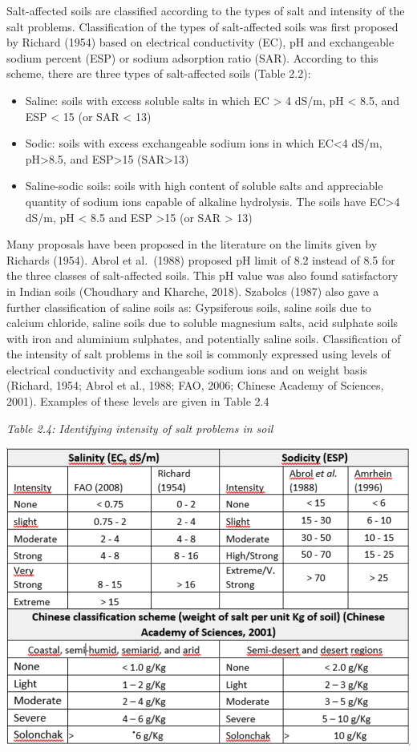 \documentclass[
  10pt,
  b5paper,
]{book}
\providecommand{\tightlist}{%
  \setlength{\itemsep}{0pt}\setlength{\parskip}{0pt}}
\begin{document}
Salt-affected soils are classified according to the types of salt and intensity of the salt problems. Classification of the types of salt-affected soils was first proposed by Richard (1954) based on electrical conductivity (EC), pH and exchangeable sodium percent (ESP) or sodium adsorption ratio (SAR). According to this scheme, there are three types of salt-affected soils (Table 2.2):

\begin{itemize}
\tightlist
\item
  Saline: soils with excess soluble salts in which EC \textgreater{} 4 dS/m, pH \textless{} 8.5, and ESP \textless{} 15 (or SAR \textless{} 13)
\item
  Sodic: soils with excess exchangeable sodium ions in which EC\textless4 dS/m, pH\textgreater8.5, and ESP\textgreater15 (SAR\textgreater13)
\item
  Saline-sodic soils: soils with high content of soluble salts and appreciable quantity of sodium ions capable of alkaline hydrolysis. The soils have EC\textgreater4 dS/m, pH \textless{} 8.5 and ESP \textgreater15 (or SAR \textgreater{} 13)
\end{itemize}

Many proposals have been proposed in the literature on the limits given by Richards (1954). Abrol et al.~(1988) proposed pH limit of 8.2 instead of 8.5 for the three classes of salt-affected soils. This pH value was also found satisfactory in Indian soils (Choudhary and Kharche, 2018). Szabolcs (1987) also gave a further classification of saline soils as: Gypsiferous soils, saline soils due to calcium chloride, saline soils due to soluble magnesium salts, acid sulphate soils with iron and aluminium sulphates, and potentially saline soils.
Classification of the intensity of salt problems in the soil is commonly expressed using levels of electrical conductivity and exchangeable sodium ions and on weight basis (Richard, 1954; Abrol et al., 1988; FAO, 2006; Chinese Academy of Sciences, 2001). Examples of these levels are given in Table 2.4

\emph{Table 2.4: Identifying intensity of salt problems in soil}

\includegraphics{figures/tables/Table_2.4.PNG}
\end{document}
